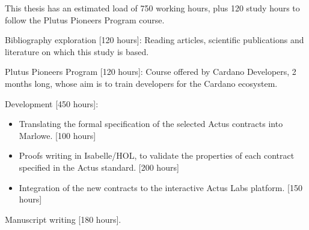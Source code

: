 \documentclass[12pt]{book}
\begin{document}
\bigskip

This thesis has an estimated load of 750 working hours, plus 120 study hours to follow the Plutus Pioneers Program course.

\begin{itemize}
    \item Bibliography exploration [120 hours]: Reading articles, scientific publications and literature on which this study is based.
    \item Plutus Pioneers Program [120 hours]: Course offered by Cardano Developers, 2 months long, whose aim is to train developers for the Cardano ecosystem.
\textcolor{darkbrown}
 {
    \item Development [450 hours]: 
    \begin{itemize}
    \item Translating the formal specification of the selected Actus contracts into Marlowe. [100 hours]
    \item Proofs writing in Isabelle/HOL, to validate the properties of each contract specified in the Actus standard. [200 hours]
    \item Integration of the new contracts to the interactive Actus Labs platform. [150 hours]
    \end{itemize}
}
\item Manuscript writing [180 hours].%
\end{itemize}

\bigskip





\end{document}
